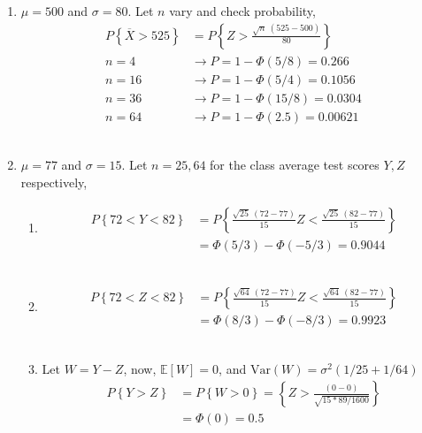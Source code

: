 \begin{enumerate}
	
	\item $ \mu = 500 $ and $ \sigma = 80 $. Let $ n $ vary and check probability, \\
	
		\begin{align}
			P \left\{\overline{X} > 525 \right\} &= P \left\{ Z > \frac{\sqrt{n}\ (525 - 500)}{80} \right\} \\
			n = 4 &\to P = 1 - \Phi(5/8) = 0.266 \nonumber \\
			n = 16 &\to P = 1 - \Phi(5/4) = 0.1056 \nonumber \\
			n = 36 &\to P = 1 - \Phi(15/8) = 0.0304 \nonumber \\
			n = 64 &\to P = 1 - \Phi(2.5) = 0.00621 \nonumber 
		\end{align}\\
	
	
	\item $ \mu = 77$ and $ \sigma = 15 $. Let $ n = 25, 64 $ for the class average test scores $ Y, Z $ respectively, \\
	
		\begin{enumerate}
			\item \begin{align}
				P \left\{72 < Y < 82 \right\} &= P \left\{ \frac{\sqrt{25}\ (72 - 77)}{15} Z < \frac{\sqrt{25}\ (82 - 77)}{15} \right\} \nonumber \\
				&= \Phi (5/3) - \Phi (-5/3) = 0.9044
			\end{align}\\
			
			\item \begin{align}
				P \left\{72 < Z < 82 \right\} &= P \left\{ \frac{\sqrt{64}\ (72 - 77)}{15} Z < \frac{\sqrt{64}\ (82 - 77)}{15} \right\} \nonumber \\
				&= \Phi (8/3) - \Phi (-8/3) = 0.9923
			\end{align}\\
			
			\item Let $ W = Y - Z $, now, $ \mathbb{E}[W] = 0$, and $ \mathrm{Var}(W) = \sigma^2 (1/25 + 1/64) $\\
			\begin{align}
				P \left\{Y > Z \right\} &= P \left\{ W > 0 \right\} = \left\{ Z > \frac{(0 - 0)}{\sqrt{15*89/1600}} \right\} \nonumber \\
				&= \Phi (0) = 0.5
			\end{align}\\
			

\end{enumerate}
\end{enumerate}

